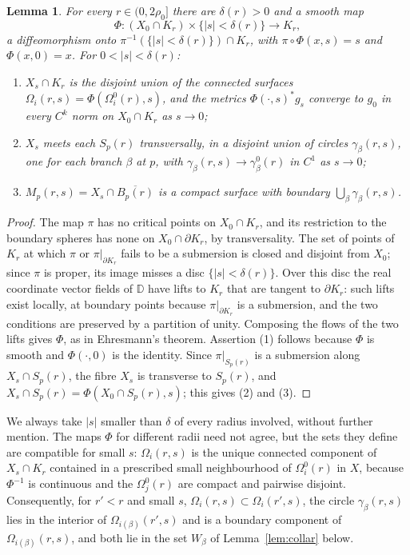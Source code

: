 \documentclass[11pt]{amsart}
\newtheorem{lemma}[theorem]{Lemma}
\theoremstyle{definition}
\theoremstyle{remark}
\begin{document}
\begin{lemma}\label{lem:thick}
For every $r\in(0,2\rho_0]$ there are $\delta(r)>0$ and a smooth map
\[
 \Phi:(X_0\cap K_r)\times\{|s|<\delta(r)\}\longrightarrow K_r,
\]
a diffeomorphism onto $\pi^{-1}(\{|s|<\delta(r)\})\cap K_r$, with
$\pi\circ\Phi(x,s)=s$ and $\Phi(x,0)=x$. For $0<|s|<\delta(r)$:
\begin{enumerate}
\item $X_s\cap K_r$ is the disjoint union of the connected surfaces
$\Omega_i(r,s)=\Phi(\Omega^0_i(r),s)$, and the metrics
$\Phi(\cdot,s)^*g_s$ converge to $g_0$ in every $C^k$ norm on
$X_0\cap K_r$ as $s\to0$;
\item $X_s$ meets each $S_p(r)$ transversally, in a disjoint union of
circles $\gamma_\beta(r,s)$, one for each branch $\beta$ at $p$,
with $\gamma_\beta(r,s)\to\gamma^0_\beta(r)$ in $C^1$ as $s\to0$;
\item $M_p(r,s)=X_s\cap\overline{B_p(r)}$ is a compact surface with
boundary $\bigcup_\beta\gamma_\beta(r,s)$.
\end{enumerate}
\end{lemma}
\begin{proof}
The map $\pi$ has no critical points on $X_0\cap K_r$, and its restriction
to the boundary spheres has none on $X_0\cap\partial K_r$, by
transversality. The set of points of $K_r$ at which $\pi$ or
$\pi|_{\partial K_r}$ fails to be a submersion is closed and disjoint from
$X_0$; since $\pi$ is proper, its image misses a disc
$\{|s|<\delta(r)\}$. Over this disc the real coordinate vector fields of
$\mathbb D$ have lifts to $K_r$ that are tangent to $\partial K_r$: such
lifts exist locally, at boundary points because $\pi|_{\partial K_r}$ is a
submersion, and the two conditions are preserved by a partition of unity.
Composing the flows of the two lifts gives $\Phi$, as in Ehresmann's
theorem. Assertion (1) follows because $\Phi$ is smooth and
$\Phi(\cdot,0)$ is the identity. Since $\pi|_{S_p(r)}$ is a submersion
along $X_s\cap S_p(r)$, the fibre $X_s$ is transverse to $S_p(r)$, and
$X_s\cap S_p(r)=\Phi(X_0\cap S_p(r),s)$; this gives (2) and (3).
\end{proof}

We always take $|s|$ smaller than $\delta$ of every radius involved, without further mention. The maps $\Phi$ for different radii
need not agree, but the sets they define are compatible for small $s$:
$\Omega_i(r,s)$ is the unique connected component of $X_s\cap K_r$
contained in a prescribed small neighbourhood of $\Omega^0_i(r)$ in $X$,
because $\Phi^{-1}$ is continuous and the $\Omega^0_j(r)$ are compact and
pairwise disjoint. Consequently, for $r'<r$ and small $s$,
$\Omega_i(r,s)\subset\Omega_i(r',s)$, the circle $\gamma_\beta(r,s)$
lies in the interior of $\Omega_{i(\beta)}(r',s)$ and is a boundary
component of $\Omega_{i(\beta)}(r,s)$, and both lie in the set $W_\beta$
of Lemma~\ref{lem:collar} below.
\end{document}
